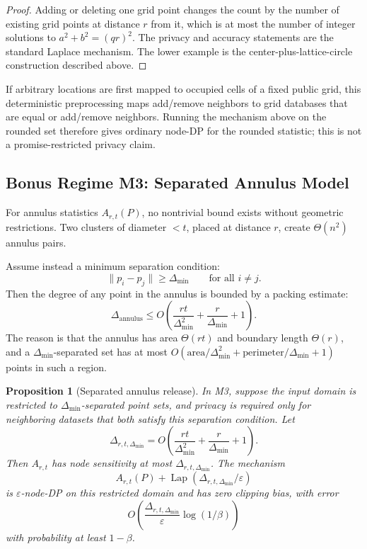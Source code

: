 \documentclass[11pt]{article}
\newtheorem{proposition}[theorem]{Proposition}
\DeclareMathOperator{\Lap}{Lap}
\newcommand{\eps}{\varepsilon}
\begin{document}
\begin{proof}
Adding or deleting one grid point changes the count by the number of existing grid points at distance \(r\) from it, which is at most the number of integer solutions to \(a^2+b^2=(qr)^2\). The privacy and accuracy statements are the standard Laplace mechanism. The lower example is the center-plus-lattice-circle construction described above.
\end{proof}

If arbitrary locations are first mapped to occupied cells of a fixed public grid, this deterministic preprocessing maps add/remove neighbors to grid databases that are equal or add/remove neighbors. Running the mechanism above on the rounded set therefore gives ordinary node-DP for the rounded statistic; this is not a promise-restricted privacy claim.

\subsection{Bonus Regime M3: Separated Annulus Model}

For annulus statistics \(A_{r,t}(P)\), no nontrivial bound exists without geometric restrictions. Two clusters of diameter \(<t\), placed at distance \(r\), create \(\Theta(n^2)\) annulus pairs.

Assume instead a minimum separation condition:
\[
\|p_i-p_j\|\ge \Delta_{\min}\qquad\text{for all }i\ne j.
\]
Then the degree of any point in the annulus is bounded by a packing estimate:
\[
\Delta_{\text{annulus}}\le O\!\left(\frac{rt}{\Delta_{\min}^2}+\frac{r}{\Delta_{\min}}+1\right).
\]
The reason is that the annulus has area \(\Theta(rt)\) and boundary length \(\Theta(r)\), and a \(\Delta_{\min}\)-separated set has at most \(O(\mathrm{area}/\Delta_{\min}^2+\mathrm{perimeter}/\Delta_{\min}+1)\) points in such a region.

\begin{proposition}[Separated annulus release]
\label{prop:m3}
In M3, suppose the input domain is restricted to \(\Delta_{\min}\)-separated point sets, and privacy is required only for neighboring datasets that both satisfy this separation condition. Let
\[
\Delta_{r,t,\Delta_{\min}}=
O\!\left(\frac{rt}{\Delta_{\min}^2}+\frac{r}{\Delta_{\min}}+1\right).
\]
Then \(A_{r,t}\) has node sensitivity at most \(\Delta_{r,t,\Delta_{\min}}\). The mechanism
\[
A_{r,t}(P)+\Lap(\Delta_{r,t,\Delta_{\min}}/\eps)
\]
is \(\eps\)-node-DP on this restricted domain and has zero clipping bias, with error
\[
O\!\left(\frac{\Delta_{r,t,\Delta_{\min}}}{\eps}\log(1/\beta)\right)
\]
with probability at least \(1-\beta\).
\end{proposition}
\end{document}
